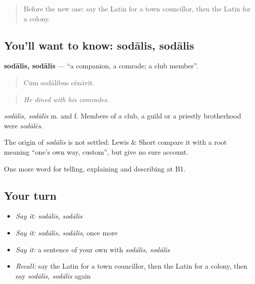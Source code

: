 \label{lesson:LA-C388-sodalis}



\begin{quote}
Before the new one: say the Latin for a town councillor, then the Latin for a colony.
\end{quote}

\subsection*{You'll want to know: sodālis, sodālis}
\textbf{sodālis, sodālis} — \textquotedblleft{}a companion, a comrade; a club member\textquotedblright{}.

\begin{quote}
Cum sodālibus cēnāvit.
\end{quote}

\begin{quote}
\emph{He dined with his comrades.}
\end{quote}

\emph{sodālis, sodālis} m. and f. Members of a club, a guild or a priestly brotherhood were \emph{sodālēs}.

\begin{cousinweb}
The origin of \emph{sodālis} is not settled: Lewis \& Short compare it with a root meaning \textquotedblleft{}one's own way, custom\textquotedblright{}, but give no sure account.
\end{cousinweb}

\begin{grammarlens}[title={What you've built}]
One more word for telling, explaining and describing at B1.
\end{grammarlens}

\subsection*{Your turn}
\begin{itemize}
\raggedright
  \item \emph{Say it:} \emph{sodālis, sodālis}
  \item \emph{Say it:} \emph{sodālis, sodālis}, once more
  \item \emph{Say it:} a sentence of your own with \emph{sodālis, sodālis}
  \item \emph{Recall:} say the Latin for a town councillor, then the Latin for a colony, then say \emph{sodālis, sodālis} again
\end{itemize}


